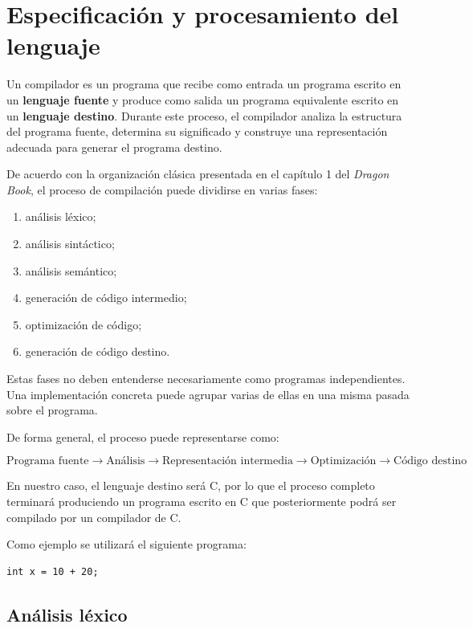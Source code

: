 \documentclass[11pt,a4paper]{article}
\begin{document}
\section{Especificación y procesamiento del lenguaje}

Un compilador es un programa que recibe como entrada un programa escrito en un
\textbf{lenguaje fuente} y produce como salida un programa equivalente escrito
en un \textbf{lenguaje destino}. Durante este proceso, el compilador analiza la
estructura del programa fuente, determina su significado y construye una
representación adecuada para generar el programa destino.

De acuerdo con la organización clásica presentada en el capítulo 1 del
\textit{Dragon Book}, el proceso de compilación puede dividirse en varias
fases:

\begin{enumerate}
    \item análisis léxico;
    \item análisis sintáctico;
    \item análisis semántico;
    \item generación de código intermedio;
    \item optimización de código;
    \item generación de código destino.
\end{enumerate}

Estas fases no deben entenderse necesariamente como programas independientes.
Una implementación concreta puede agrupar varias de ellas en una misma
pasada sobre el programa.

De forma general, el proceso puede representarse como:

\[
\text{Programa fuente}
\rightarrow
\text{Análisis}
\rightarrow
\text{Representación intermedia}
\rightarrow
\text{Optimización}
\rightarrow
\text{Código destino}
\]

En nuestro caso, el lenguaje destino será C, por lo que el proceso completo
terminará produciendo un programa escrito en C que posteriormente podrá ser
compilado por un compilador de C.

Como ejemplo se utilizará el siguiente programa:

\begin{lstlisting}
int x = 10 + 20;
\end{lstlisting}

\subsection{Análisis léxico}
\end{document}
